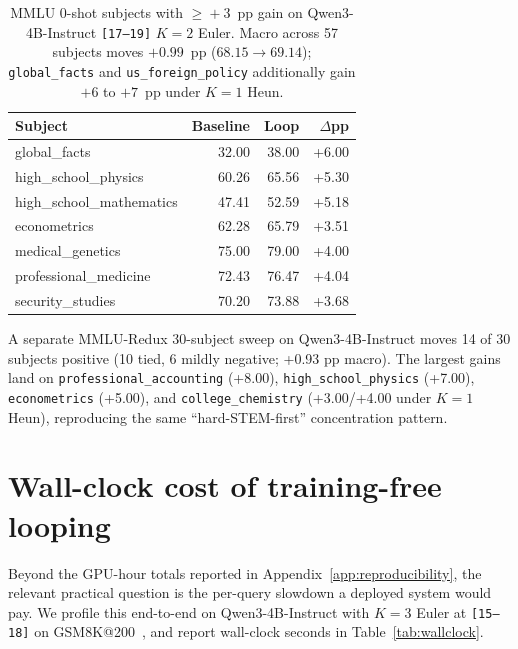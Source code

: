 \begin{table}[h]
\centering
\footnotesize
\caption{MMLU 0-shot subjects with $\geq\!{+}3$~pp gain on
Qwen3-4B-Instruct \texttt{[17--19]} $K{=}2$ Euler. Macro across 57
subjects moves $+0.99$~pp ($68.15 \to 69.14$); \texttt{global\_facts}
and \texttt{us\_foreign\_policy} additionally gain $+6$ to $+7$~pp
under $K{=}1$ Heun.}
\label{tab:mmlu-redux-subjects}
\setlength{\tabcolsep}{8pt}
\begin{tabular}{lrrr}
\toprule
Subject & Baseline & Loop & $\Delta$pp \\
\midrule
global\_facts                    & 32.00 & 38.00 & +6.00 \\
high\_school\_physics            & 60.26 & 65.56 & +5.30 \\
high\_school\_mathematics        & 47.41 & 52.59 & +5.18 \\
econometrics                     & 62.28 & 65.79 & +3.51 \\
medical\_genetics                & 75.00 & 79.00 & +4.00 \\
professional\_medicine           & 72.43 & 76.47 & +4.04 \\
security\_studies                & 70.20 & 73.88 & +3.68 \\
\bottomrule
\end{tabular}
\end{table}

A separate MMLU-Redux 30-subject sweep on Qwen3-4B-Instruct moves 14 of 30 subjects positive (10 tied, 6 mildly negative; +0.93 pp macro). The largest gains land on \texttt{professional\_accounting} (+8.00), \texttt{high\_school\_physics} (+7.00), \texttt{econometrics} (+5.00), and \texttt{college\_chemistry} (+3.00/+4.00 under $K{=}1$ Heun), reproducing the same ``hard-STEM-first'' concentration pattern.

\section{Wall-clock cost of training-free looping}
\label{app:wallclock}

Beyond the GPU-hour totals reported in Appendix~\ref{app:reproducibility}, the relevant practical question is the per-query slowdown a deployed system would pay. We profile this end-to-end on Qwen3-4B-Instruct with $K{=}3$ Euler at \texttt{[15--18]} on GSM8K@200~\citep{cobbe2021gsm8k}, and report wall-clock seconds in Table~\ref{tab:wallclock}.

